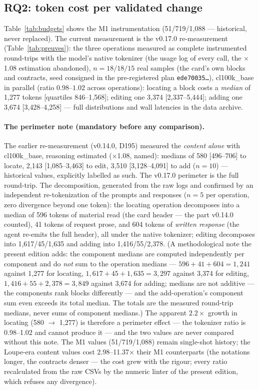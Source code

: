 \documentclass[11pt,a4paper]{article}
\newcommand{\code}[1]{\texttt{\small #1}}
\begin{document}
\subsection{RQ2: token cost per validated change}\label{sec:rq2}

Table~\ref{tab:budgets} shows the M1 instrumentation (51/719/1{,}088 ---
historical, never replaced). The current measurement is the v0.17.0
re-measurement (Table~\ref{tab:preuves}): the three operations measured
as complete instrumented round-trips with the model's native tokenizer
(the usage log of every call, the $\times$1.08 estimation abandoned),
$n{=}18/18/15$ real samples (the card's own blocks and contracts, seed
consigned in the pre-registered plan \code{ede70035\ldots}),
cl100k\_base in parallel (ratio $0.98$--$1.02$ across operations):
locating a block costs a \emph{median} of 1{,}277 tokens [quartiles
846--1{,}568]; editing one 3{,}374 [2{,}337--5{,}444]; adding one 3{,}674
[3{,}428--4{,}258] --- full distributions and wall latencies in the data
archive.

\paragraph{The perimeter note (mandatory before any comparison).}
The earlier re-measurement (v0.14.0, D195) measured the \emph{content
alone} with cl100k\_base, reasoning estimated ($\times$1.08, named):
medians of 580 [496--706] to locate, 2{,}143 [1{,}085--3{,}463] to edit,
3{,}510 [3{,}128--4{,}091] to add ($n{=}10$) --- historical values,
explicitly labelled as such. The v0.17.0 perimeter is the full
round-trip. The decomposition, generated from the raw logs and
confirmed by an independent re-tokenization of the prompts and responses
($n{=}5$ per operation, zero divergence beyond one token): the locating
operation decomposes into a median of 596 tokens of material read (the
card header --- the part v0.14.0 counted), 41 tokens of request prose,
and 604 tokens of \emph{written response} (the agent re-emits the full
header), all under the native tokenizer; editing decomposes into
1{,}617/45/1{,}635 and adding into 1{,}416/55/2{,}378. (A
methodological note the present edition adds: the component medians are
computed independently per component and do \emph{not} sum to the
operation medians --- $596{+}41{+}604 = 1{,}241$ against 1{,}277 for
locating, $1{,}617{+}45{+}1{,}635 = 3{,}297$ against 3{,}374 for
editing, $1{,}416{+}55{+}2{,}378 = 3{,}849$ against 3{,}674 for adding;
medians are not additive --- the components rank blocks differently ---
and the add-operation's component sum even exceeds its total median.
The totals are the measured round-trip medians, never sums of component
medians.) The apparent
$2.2\times$ growth in locating (580 $\to$ 1{,}277) is therefore a
perimeter effect --- the tokenizer ratio is 0.98--1.02 and cannot
produce it --- and the two values are never compared without this note.
The M1 values (51/719/1{,}088) remain single-shot history; the
Loupe-era content values cost 2.98--11.37$\times$ their M1 counterparts
(the notations longer, the contracts denser --- the cost grew with the
rigour; every ratio recalculated from the raw CSVs by the numeric
linter of the present edition, which refuses any divergence).
\end{document}

